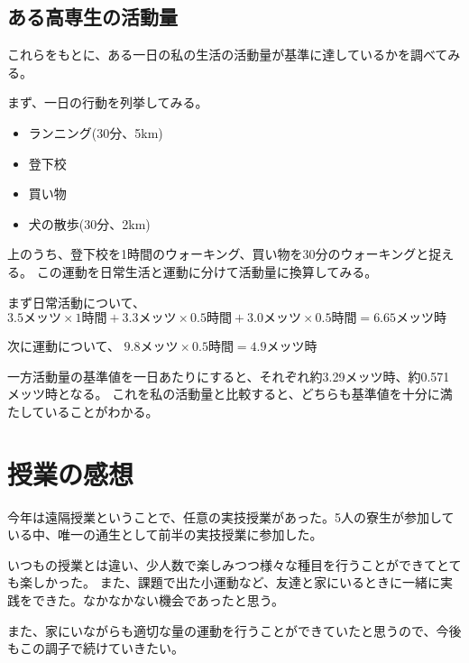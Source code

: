 \documentclass[titlepage]{jsarticle}
\begin{document}
    \subsection{ある高専生の活動量}
        これらをもとに、ある一日の私の生活の活動量が基準に達しているかを調べてみる。
        
        まず、一日の行動を列挙してみる。

        \begin{itemize}
            \item ランニング(30分、5km)
            \item 登下校
            \item 買い物
            \item 犬の散歩(30分、2km)
        \end{itemize}

        上のうち、登下校を1時間のウォーキング、買い物を30分のウォーキングと捉える。
        この運動を日常生活と運動に分けて活動量に換算してみる。

        まず日常活動について、
        $3.5 メッツ \times 1 時間 + 3.3 メッツ \times 0.5 時間 + 3.0 メッツ \times 0.5 時間 = 6.65メッツ時$

        次に運動について、
        $9.8 メッツ \times 0.5 時間 = 4.9 メッツ時$

        一方活動量の基準値を一日あたりにすると、それぞれ約3.29メッツ時、約0.571メッツ時となる。
        これを私の活動量と比較すると、どちらも基準値を十分に満たしていることがわかる。

\section{授業の感想}
    今年は遠隔授業ということで、任意の実技授業があった。5人の寮生が参加している中、唯一の通生として前半の実技授業に参加した。

    いつもの授業とは違い、少人数で楽しみつつ様々な種目を行うことができてとても楽しかった。
    また、課題で出た小運動など、友達と家にいるときに一緒に実践をできた。なかなかない機会であったと思う。

    また、家にいながらも適切な量の運動を行うことができていたと思うので、今後もこの調子で続けていきたい。
\end{document}
